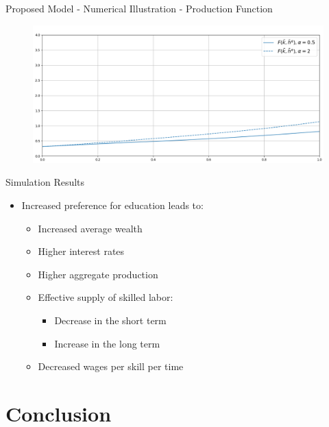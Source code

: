 \documentclass{beamer}
\begin{document}
\begin{frame}{Proposed Model - Numerical Illustration - Production Function}
\begin{figure}[h!]
\includegraphics[width=\textwidth]{presentation/model_simulations/simulations_mfg_production.png}
\end{figure}

\end{frame}

\begin{frame}{Simulation Results}
\begin{itemize}
    \item Increased preference for education leads to:
    \begin{itemize}
        \item Increased average wealth
        \item Higher interest rates
        \item Higher aggregate production
        \item Effective supply of skilled labor:
        \begin{itemize}
            \item Decrease in the short term
            \item Increase in the long term
        \end{itemize}
        \item Decreased wages per skill per time
    \end{itemize}
\end{itemize}
\end{frame}

\section{Conclusion}
\end{document}
